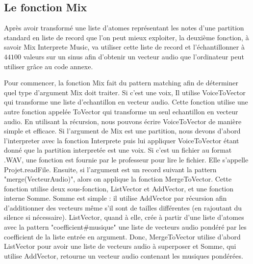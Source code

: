 \documentclass[a4paper,12pt]{article}
\begin{document}
\subsection{Le fonction Mix}

Après avoir transformé une liste d'atomes représentant les notes d'une partition standard en liste de record que l'on peut
mieux exploiter, la deuxième fonction, à savoir {Mix Interprete Music}, va utiliser cette liste de record et l'échantillonner
à $44100$ valeurs sur un sinus afin d'obtenir un vecteur audio que l'ordinateur peut utiliser grâce au code annexe.

Pour commencer, la fonction Mix fait du pattern matching afin de déterminer quel type d'argument Mix doit traiter.
Si c'est une voix, Il utilise VoiceToVector qui transforme une liste d'echantillon en vecteur audio. Cette fonction
utilise une autre fonction appelée ToVector qui transforme un seul echantillon en vecteur audio. En utilisant la récursion,
nous pouvons écrire VoiceToVector de manière simple et efficace. Si l'argument de Mix est une partition, nous devons d'abord
l'interpreter avec la fonction Interprete puis lui appliquer VoiceToVector étant donné que la partition interpretée est une voix.
Si c'est un fichier au format .WAV, une fonction est fournie par le professeur pour lire le fichier. Elle s'appelle
Projet.readFile. Ensuite, si l'argument est un record suivant la pattern "merge(VecteurAudio)", alors on applique la fonction
MergeToVector. Cette fonction utilise deux sous-fonction, ListVector et AddVector, et une fonction interne Somme. Somme est simple :
il utilise AddVector par récursion afin d'additionner des vecteurs même s'il sont de tailles différentes
(en rajoutant du silence si nécessaire). ListVector, quand à elle, crée à partir d'une liste d'atomes
avec la pattern "coefficient#musique" une liste de vecteurs audio pondéré par les coefficient de la liste entrée en argument.
Donc, MergeToVector utilise d'abord ListVector pour avoir une liste de vecteurs audio à superposer et Somme,
qui utilise AddVector, retourne un vecteur audio contenant les musiques pondérées.
\end{document}
